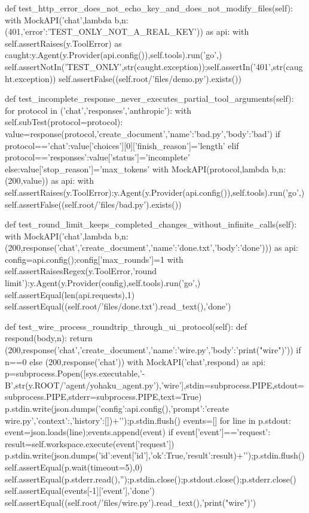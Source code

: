    def test_http_error_does_not_echo_key_and_does_not_modify_files(self):
        with MockAPI('chat',lambda b,n:(401,{'error':'TEST_ONLY_NOT_A_REAL_KEY'})) as api:
            with self.assertRaises(y.ToolError) as caught:y.Agent(y.Provider(api.config()),self.tools).run('go',{})
            self.assertNotIn('TEST_ONLY',str(caught.exception));self.assertIn('401',str(caught.exception))
        self.assertFalse((self.root/'files/demo.py').exists())

    def test_incomplete_response_never_executes_partial_tool_arguments(self):
        for protocol in ('chat','responses','anthropic'):
            with self.subTest(protocol=protocol):
                value=response(protocol,'create_document',{'name':'bad.py','body':'bad'})
                if protocol=='chat':value['choices'][0]['finish_reason']='length'
                elif protocol=='responses':value['status']='incomplete'
                else:value['stop_reason']='max_tokens'
                with MockAPI(protocol,lambda b,n:(200,value)) as api:
                    with self.assertRaises(y.ToolError):y.Agent(y.Provider(api.config()),self.tools).run('go',{})
                self.assertFalse((self.root/'files/bad.py').exists())

    def test_round_limit_keeps_completed_changes_without_infinite_calls(self):
        with MockAPI('chat',lambda b,n:(200,response('chat','create_document',{'name':'done.txt','body':'done'}))) as api:
            config=api.config();config['max_rounds']=1
            with self.assertRaisesRegex(y.ToolError,'round limit'):y.Agent(y.Provider(config),self.tools).run('go',{})
            self.assertEqual(len(api.requests),1)
        self.assertEqual((self.root/'files/done.txt').read_text(),'done')

    def test_wire_process_roundtrip_through_ui_protocol(self):
        def respond(body,n):
            return (200,response('chat','create_document',{'name':'wire.py','body':'print("wire")'})) if n==0 else (200,response('chat'))
        with MockAPI('chat',respond) as api:
            p=subprocess.Popen([sys.executable,'-B',str(y.ROOT/'agent/yohaku_agent.py'),'wire'],stdin=subprocess.PIPE,stdout=subprocess.PIPE,stderr=subprocess.PIPE,text=True)
            p.stdin.write(json.dumps({'config':api.config(),'prompt':'create wire.py','context':{},'history':[]})+'\n');p.stdin.flush()
            events=[]
            for line in p.stdout:
                event=json.loads(line);events.append(event)
                if event['event']=='request':
                    result=self.workspace.execute(event['request'])
                    p.stdin.write(json.dumps({'id':event['id'],'ok':True,'result':result})+'\n');p.stdin.flush()
            self.assertEqual(p.wait(timeout=5),0)
            self.assertEqual(p.stderr.read(),'');p.stdin.close();p.stdout.close();p.stderr.close()
            self.assertEqual(events[-1]['event'],'done')
        self.assertEqual((self.root/'files/wire.py').read_text(),'print("wire")')

